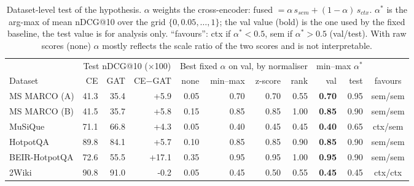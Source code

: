 \begin{table}[t]
\centering\small\setlength{\tabcolsep}{4pt}
\begin{tabular}{lrrrrrrrrrc}
\toprule
 & \multicolumn{3}{c}{Test nDCG@10 ($\times$100)} & \multicolumn{4}{c}{Best fixed $\alpha$ on val, by normaliser} & \multicolumn{2}{c}{min--max $\alpha^*$} & \\
\cmidrule(lr){2-4}\cmidrule(lr){5-8}\cmidrule(lr){9-10}
Dataset & CE & GAT & CE$-$GAT & none & min--max & z-score & rank & val & test & favours \\
\midrule
MS MARCO (A) & 41.3 & 35.4 & +5.9 & 0.05 & 0.70 & 0.70 & 0.55 & \textbf{0.70} & 0.95 & sem/sem \\
MS MARCO (B) & 41.5 & 35.7 & +5.8 & 0.15 & 0.85 & 0.85 & 1.00 & \textbf{0.85} & 0.90 & sem/sem \\
MuSiQue & 71.1 & 66.8 & +4.3 & 0.05 & 0.40 & 0.45 & 0.45 & \textbf{0.40} & 0.65 & ctx/sem \\
HotpotQA & 89.8 & 84.1 & +5.7 & 0.10 & 0.85 & 0.85 & 0.90 & \textbf{0.85} & 0.90 & sem/sem \\
BEIR-HotpotQA & 72.6 & 55.5 & +17.1 & 0.35 & 0.95 & 0.95 & 1.00 & \textbf{0.95} & 0.90 & sem/sem \\
2Wiki & 90.8 & 91.0 & -0.2 & 0.05 & 0.45 & 0.50 & 0.55 & \textbf{0.45} & 0.45 & ctx/ctx \\
\bottomrule
\end{tabular}
\caption{Dataset-level test of the hypothesis. $\alpha$ weights the cross-encoder: fused $=\alpha\, s_{sem} + (1-\alpha)\, s_{ctx}$. $\alpha^*$ is the arg-max of mean nDCG@10 over the grid $\{0,0.05,\dots,1\}$; the val value (bold) is the one used by the fixed baseline, the test value is for analysis only. ``favours'': ctx if $\alpha^*<0.5$, sem if $\alpha^*>0.5$ (val/test). With raw scores (none) $\alpha$ mostly reflects the scale ratio of the two scores and is not interpretable.}
\label{tab:dsalpha}
\end{table}
